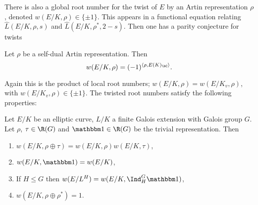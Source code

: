 \vspace{1em}
There is also a global root number for the twist of $E$ by an Artin representation $\rho$, denoted $w(E / K, \rho) \in \{ \pm 1 \}$. This appears in a functional equation relating $\hat{L}(E / K, \rho, s)$ and $\hat{L}(E / K, \rho^*, 2 - s)$. Then one has a parity conjecture for twists

\begin{conj}
   Let $\rho$ be a self-dual Artin representation. Then $$ w(E / K, \rho) = (-1)^{\langle \rho, E(K)_{\bC} \rangle}.$$
\end{conj}


Again this is the product of local root numbers; $w(E / K, \rho) = w(E / K_v, \rho)$, with $w(E / K_v, \rho) \in \{ \pm 1\}$. The twisted root numbers satisfy the following properties:

\begin{prop}\cite[Lemma A.1, Proposition A.2]{reg-const}\label{compute-root-twist}
    Let $E / K$ be an elliptic curve, $L / K$ a finite Galois extension with Galois group $G$. Let $\rho$, $\tau \in \R(G)$ and $\trivial \in \R(G)$ be the trivial representation. Then
    \begin{enumerate}
        \setlength\itemsep{0em}
        \item $w(E / K, \rho \oplus \tau) = w(E / K, \rho) w(E / K, \tau)$,
        \item $w(E / K, \trivial) = w(E/ K)$, 
        \item If $H \leq G$ then $w(E / L^H) = w(E/ K, \Ind_{H}^G \trivial)$, 
        \item $w(E / K, \rho \oplus \rho^*) = 1$.
    \end{enumerate}
    
\end{prop}
